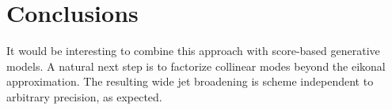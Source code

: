 \section{Conclusions}\label{sec:conclusions}

It would be interesting to combine this approach with score-based
generative models. A natural next step is to factorize collinear modes
beyond the eikonal approximation. The resulting wide jet broadening is
scheme independent to arbitrary precision, as expected.

